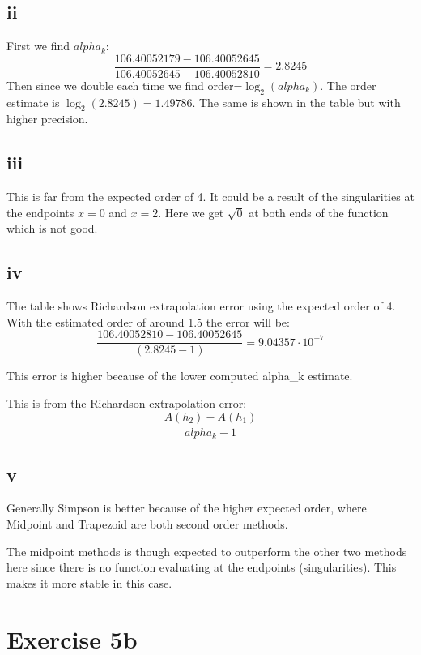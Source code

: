 \documentclass{article}
\begin{document}
\subsection*{ii}
First we find $alpha_k$:
$$
\frac{106.40052179-106.40052645}{106.40052645-106.40052810}=2.8245
$$
Then since we double each time we find order=$\log_2(alpha_k)$.
The order estimate is $\log_2(2.8245)=1.49786$. The same is shown in the table but with higher precision.
\subsection*{iii}
This is far from the expected order of 4. It could be a result of the singularities at the endpoints $x=0$ and $x=2$. Here we get $\sqrt{0}$ at both ends of the function which is not good.

\subsection*{iv}
The table shows Richardson extrapolation error using the expected order of 4. With the estimated order of around 1.5 the error will be:
$$
\frac{106.40052810-106.40052645}{(2.8245-1)}=9.04357\cdot10^{-7}
$$

This error is higher because of the lower computed alpha\_k estimate.

This is from the Richardson extrapolation error:
$$\frac{A(h_2)-A(h_1)}{alpha_k-1}$$

\subsection*{v}
Generally Simpson is better because of the higher expected order, where Midpoint and Trapezoid are both second order methods.

The midpoint methods is though expected to outperform the other two methods here since there is no function evaluating at the endpoints (singularities). This makes it more stable in this case.

\newpage
\section*{Exercise 5b}
\end{document}
